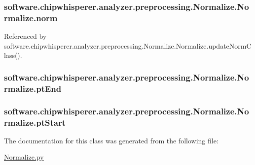 \subsubsection[{norm}]{\setlength{\rightskip}{0pt plus 5cm}software.\+chipwhisperer.\+analyzer.\+preprocessing.\+Normalize.\+Normalize.\+norm}\label{classsoftware_1_1chipwhisperer_1_1analyzer_1_1preprocessing_1_1Normalize_1_1Normalize_a51aec3d50e321c171d7b9369d5805194}


Referenced by software.\+chipwhisperer.\+analyzer.\+preprocessing.\+Normalize.\+Normalize.\+update\+Norm\+Class().

\hypertarget{classsoftware_1_1chipwhisperer_1_1analyzer_1_1preprocessing_1_1Normalize_1_1Normalize_a79ca86394e336e12db727309a0c808c6}{}
\subsubsection[{pt\+End}]{\setlength{\rightskip}{0pt plus 5cm}software.\+chipwhisperer.\+analyzer.\+preprocessing.\+Normalize.\+Normalize.\+pt\+End}\label{classsoftware_1_1chipwhisperer_1_1analyzer_1_1preprocessing_1_1Normalize_1_1Normalize_a79ca86394e336e12db727309a0c808c6}
\hypertarget{classsoftware_1_1chipwhisperer_1_1analyzer_1_1preprocessing_1_1Normalize_1_1Normalize_a6fb33271683cfc2543556e4bb95088ec}{}
\subsubsection[{pt\+Start}]{\setlength{\rightskip}{0pt plus 5cm}software.\+chipwhisperer.\+analyzer.\+preprocessing.\+Normalize.\+Normalize.\+pt\+Start}\label{classsoftware_1_1chipwhisperer_1_1analyzer_1_1preprocessing_1_1Normalize_1_1Normalize_a6fb33271683cfc2543556e4bb95088ec}


The documentation for this class was generated from the following file\+:\begin{DoxyCompactItemize}
\item 
\hyperlink{Normalize_8py}{Normalize.\+py}\end{DoxyCompactItemize}
